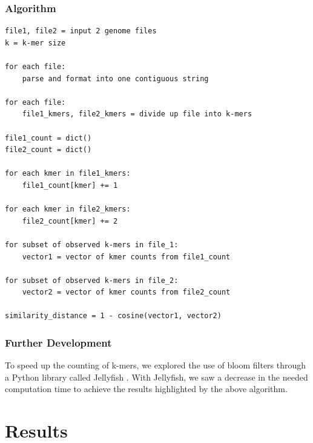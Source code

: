 \documentclass[12pt, letterpaper]{article}
\begin{document}
\subsubsection{Algorithm}
\begin{verbatim}
file1, file2 = input 2 genome files 
k = k-mer size

for each file:
    parse and format into one contiguous string

for each file:
    file1_kmers, file2_kmers = divide up file into k-mers

file1_count = dict()
file2_count = dict()

for each kmer in file1_kmers:
    file1_count[kmer] += 1

for each kmer in file2_kmers:
    file2_count[kmer] += 2

for subset of observed k-mers in file_1:
    vector1 = vector of kmer counts from file1_count

for subset of observed k-mers in file_2:
    vector2 = vector of kmer counts from file2_count

similarity_distance = 1 - cosine(vector1, vector2)
\end{verbatim}

\subsubsection{Further Development}
To speed up the counting of k-mers, we explored the use of bloom filters through a Python library called Jellyfish \cite{Jellyfish}. With Jellyfish, we saw a decrease in the needed computation time to achieve the results highlighted by the above algorithm.

\section{Results}
\end{document}
